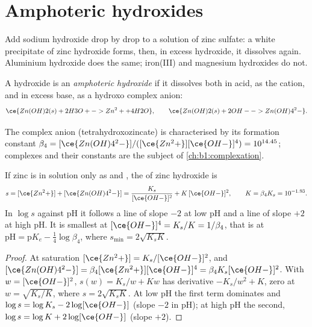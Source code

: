 \section{Amphoteric hydroxides}\label{sec:b1:precipitation:amphoteric}

Add sodium hydroxide drop by drop to a solution of zinc sulfate: a white
precipitate of zinc hydroxide forms, then, in excess hydroxide, it
dissolves again. Aluminium hydroxide does the same; iron(III) and
magnesium hydroxides do not.

\begin{definition}\label{def:b1:precipitation:amphoteric-hydroxide}
A hydroxide is an \emph{amphoteric hydroxide}
if it dissolves both in acid, as the cation, and in excess base, as a
hydroxo complex anion:
\[
  \ce{Zn(OH)2(s) + 2H3O+ -> Zn^2+ + 4H2O}, \qquad
  \ce{Zn(OH)2(s) + 2OH- -> Zn(OH)4^2-} .
\]
\end{definition}

The complex anion  (tetrahydroxozincate) is characterised by
its formation constant $\beta_4 = [\ce{Zn(OH)4^2-}]/([\ce{Zn^2+}][\ce{OH-}]^4)
= 10^{14.45}$; complexes and their constants are the subject of
\cref{ch:b1:complexation}.

\begin{proposition}\label{prop:b1:precipitation:amphoteric}
If zinc is in solution only as  and , the
 of zinc hydroxide is
\[
  s = [\ce{Zn^2+}] + [\ce{Zn(OH)4^2-}] = \frac{K_s}{[\ce{OH-}]^2} + K\,[\ce{OH-}]^2,
  \qquad K = \beta_4 K_s = 10^{-1.93} .
\]
In $\log s$ against pH it follows a line of slope $-2$ at low pH and a line
of slope $+2$ at high pH. It is smallest at
$[\ce{OH-}]^4 = K_s/K = 1/\beta_4$, that is at $\mathrm{pH} =
\mathrm{p}K_e - \frac14\log\beta_4$, where $s_{\min} = 2\sqrt{K_s K}$.
\end{proposition}

\begin{proof}
At saturation $[\ce{Zn^2+}] = K_s/[\ce{OH-}]^2$, and
$[\ce{Zn(OH)4^2-}] = \beta_4[\ce{Zn^2+}][\ce{OH-}]^4 = \beta_4 K_s
[\ce{OH-}]^2$. With $w = [\ce{OH-}]^2$, $s(w) = K_s/w + Kw$ has derivative
$-K_s/w^2 + K$, zero at $w = \sqrt{K_s/K}$, where $s = 2\sqrt{K_s K}$. At
low pH the first term dominates and $\log s = \log K_s - 2\log[\ce{OH-}]$
(slope $-2$ in pH); at high pH the second, $\log s = \log K + 2\log[\ce{OH-}]$
(slope $+2$).
\end{proof}

